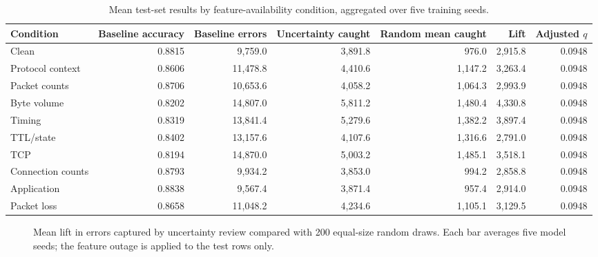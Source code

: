 \documentclass[conference]{IEEEtran}
\begin{document}
\begin{table}[t]
\caption{Mean test-set results by feature-availability condition, aggregated over five training seeds.}
\label{tab:outage_results}
\centering
\scriptsize
\begin{tabular}{lrrrrrr}
\toprule
Condition & Baseline accuracy & Baseline errors & Uncertainty caught & Random mean caught & Lift & Adjusted $q$ \\
\midrule
Clean & 0.8815 & 9,759.0 & 3,891.8 & 976.0 & 2,915.8 & 0.0948 \\
Protocol context & 0.8606 & 11,478.8 & 4,410.6 & 1,147.2 & 3,263.4 & 0.0948 \\
Packet counts & 0.8706 & 10,653.6 & 4,058.2 & 1,064.3 & 2,993.9 & 0.0948 \\
Byte volume & 0.8202 & 14,807.0 & 5,811.2 & 1,480.4 & 4,330.8 & 0.0948 \\
Timing & 0.8319 & 13,841.4 & 5,279.6 & 1,382.2 & 3,897.4 & 0.0948 \\
TTL/state & 0.8402 & 13,157.6 & 4,107.6 & 1,316.6 & 2,791.0 & 0.0948 \\
TCP & 0.8194 & 14,870.0 & 5,003.2 & 1,485.1 & 3,518.1 & 0.0948 \\
Connection counts & 0.8793 & 9,934.2 & 3,853.0 & 994.2 & 2,858.8 & 0.0948 \\
Application & 0.8838 & 9,567.4 & 3,871.4 & 957.4 & 2,914.0 & 0.0948 \\
Packet loss & 0.8658 & 11,048.2 & 4,234.6 & 1,105.1 & 3,129.5 & 0.0948 \\
\bottomrule
\end{tabular}
\end{table}

\begin{figure}[t]
\centering
{}
\caption{Mean lift in errors captured by uncertainty review compared with 200 equal-size random draws. Each bar averages five model seeds; the feature outage is applied to the test rows only.}
\label{fig:outage_lift}
\end{figure}
\end{document}
